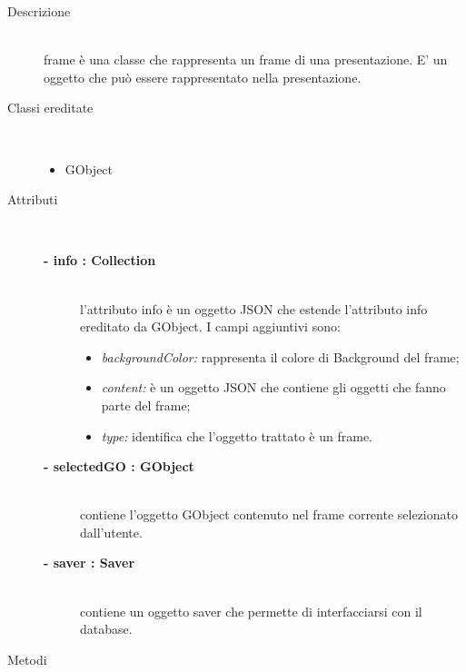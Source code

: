 \begin{description}
\item[Descrizione] \hfill \\
	frame è una classe che rappresenta un frame di una presentazione. E' un oggetto che può essere rappresentato nella presentazione. 
	
\item[Classi ereditate] \hfill \\
	\begin{itemize}
		\item GObject
	\end{itemize}
	
\item[Attributi] \hfill \\
	\begin{description}
		\item[\textbf{- info : Collection			}] \hfill \\
			l'attributo info è un oggetto JSON che estende l'attributo info ereditato da GObject. I campi aggiuntivi sono:
	\begin{itemize}
		\item \textit{backgroundColor:} rappresenta il colore di Background del frame;
		\item \textit{content:} è un oggetto JSON che contiene gli oggetti che fanno parte del frame;
		\item \textit{type:} identifica che l'oggetto trattato è un frame.
	\end{itemize}
	\end{description}
	\begin{description}
		\item[\textbf{- selectedGO : GObject			}] \hfill \\
			contiene l'oggetto GObject contenuto nel frame corrente selezionato dall'utente.  
	\end{description}
	\begin{description}
		\item[\textbf{- saver : Saver			}] \hfill \\
			contiene un oggetto saver che permette di interfacciarsi con il database.  
	\end{description}
	
\item[Metodi] \hfill \\


\end{description}
